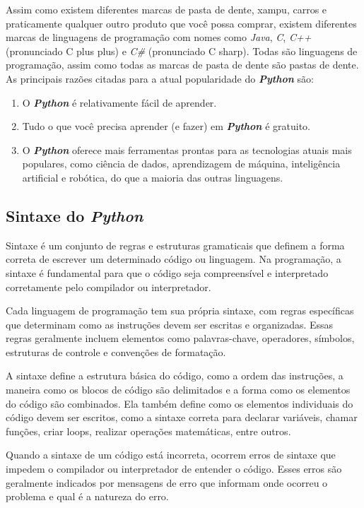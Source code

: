 \documentclass[a4paper, 12pt, onecolumn,singlespacing]{article}
\begin{document}
	Assim como existem diferentes marcas de pasta de dente, xampu, carros e praticamente qualquer outro produto que você possa comprar, existem diferentes marcas de linguagens de programação com nomes como \textit{Java}, \textit{C}, \textit{C++} (pronunciado C plus plus) e \textit{C\#} (pronunciado C sharp). Todas são linguagens de programação, assim como todas as marcas de pasta de dente são pastas de dente. As principais razões citadas para a atual popularidade do \textbf{\textit{Python}} são:
	\begin{enumerate}
		\item O \textbf{\textit{Python}} é relativamente fácil de aprender.
		\item Tudo o que você precisa aprender (e fazer) em \textbf{\textit{Python}} é gratuito.
		\item O \textbf{\textit{Python}} oferece mais ferramentas prontas para as tecnologias atuais mais populares, como ciência de dados, aprendizagem de máquina, inteligência artificial e robótica, do que a maioria das outras linguagens.
	\end{enumerate}
	
	\subsection{Sintaxe do \textit{Python}}
	Sintaxe é um conjunto de regras e estruturas gramaticais que definem a forma correta de escrever um determinado código ou linguagem. Na programação, a sintaxe é fundamental para que o código seja compreensível e interpretado corretamente pelo compilador ou interpretador.
	
	Cada linguagem de programação tem sua própria sintaxe, com regras específicas que determinam como as instruções devem ser escritas e organizadas. Essas regras geralmente incluem elementos como palavras-chave, operadores, símbolos, estruturas de controle e convenções de formatação.
	
	A sintaxe define a estrutura básica do código, como a ordem das instruções, a maneira como os blocos de código são delimitados e a forma como os elementos do código são combinados. Ela também define como os elementos individuais do código devem ser escritos, como a sintaxe correta para declarar variáveis, chamar funções, criar loops, realizar operações matemáticas, entre outros.
	
	Quando a sintaxe de um código está incorreta, ocorrem erros de sintaxe que impedem o compilador ou interpretador de entender o código. Esses erros são geralmente indicados por mensagens de erro que informam onde ocorreu o problema e qual é a natureza do erro.
	
\end{document}
